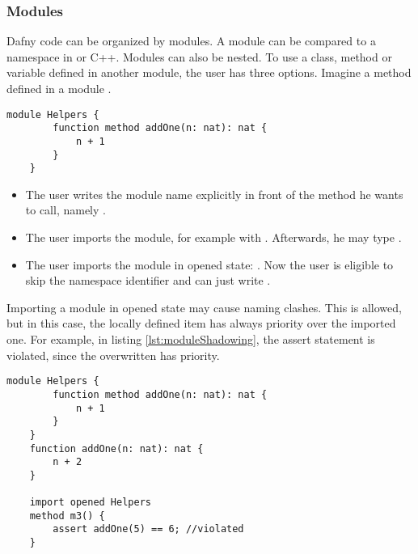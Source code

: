 \subsubsection{Modules}

Dafny code can be organized by modules. A module can be compared to a namespace in \Csharp or C++. Modules can also be nested. To use a class, method or variable defined in another module, the user has three options. Imagine a method  defined in a module .

\begin{lstlisting}[language=dafny, caption={Module Example}, captionpos=b, label={lst:addOneMethod}]
    module Helpers {
        function method addOne(n: nat): nat {
            n + 1
        }
    }
\end{lstlisting}

\begin{itemize}
    \item The user writes the module name explicitly in front of the method he wants to call, \linebreak namely .
    \item The user imports the module, for example with . Afterwards, he may type .
    \item The user imports the module in opened state: . Now the user is eligible to skip the namespace identifier and can just write .
\end{itemize}

Importing a module in opened state may cause naming clashes. This is allowed, but in this case, the locally defined item has always priority over the imported one. For example, in listing \ref{lst:moduleShadowing}, the assert statement is violated, since the overwritten  has priority. \cite{functionVSMethod}

\begin{lstlisting}[language = dafny, caption={Naming Clash}, captionpos=b, label={lst:moduleShadowing}]
    module Helpers {
        function method addOne(n: nat): nat {
            n + 1
        }
    }
    function addOne(n: nat): nat {
        n + 2
    }

    import opened Helpers
    method m3() {
        assert addOne(5) == 6; //violated
    }

\end{lstlisting}

